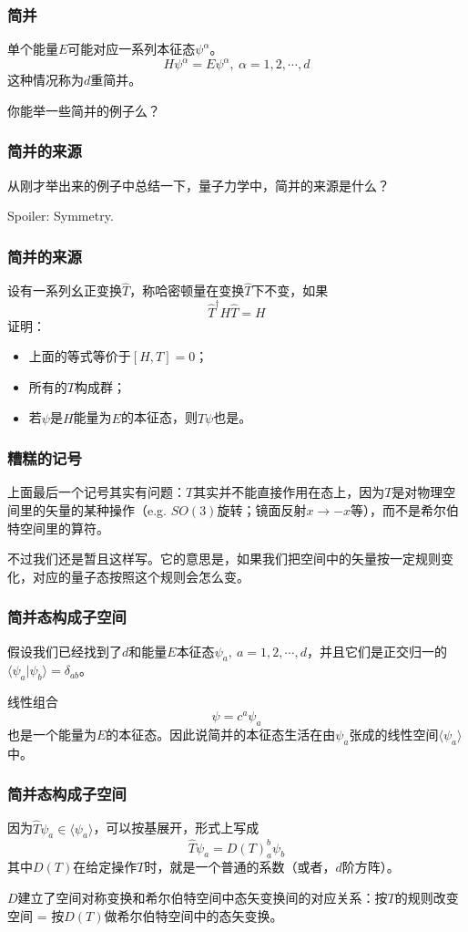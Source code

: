 \documentclass[CJK]{beamer}
\begin{document}
\begin{frame}
\frametitle{\bch 简并 \ech}
\bch
单个能量$E$可能对应一系列本征态$\psi^\alpha$。
$$
H \psi^\alpha = E \psi^\alpha ,\ \alpha = 1,2,\cdots , d
$$
这种情况称为$d$重简并。
\par
你能举一些简并的例子么？
\ech
\end{frame}

\begin{frame}
\frametitle{\bch 简并的来源 \ech}
\bch
从刚才举出来的例子中总结一下，量子力学中，简并的来源是什么？
\par
Spoiler: Symmetry.
\ech
\end{frame}

\begin{frame}
\frametitle{\bch 简并的来源 \ech}
\bch
设有一系列幺正变换$\hat T$，称哈密顿量在变换$\hat T$下不变，如果
$$
\hat{T}^\dagger H \hat T = H
$$
证明：
\begin{itemize}
\item 上面的等式等价于$[H,T] = 0$；
\item 所有的$T$构成群；
\item 若$\psi$是$H$能量为$E$的本征态，则$\hat T \psi$也是。
\end{itemize}

\ech
\end{frame}

\begin{frame}
\frametitle{\bch 糟糕的记号 \ech}
\bch
上面最后一个记号其实有问题：$T$其实并不能直接作用在态上，因为$T$是对物理空间里的矢量的某种操作（e.g. $SO(3)$旋转；镜面反射$x \to -x$等），而不是希尔伯特空间里的算符。
\par
不过我们还是暂且这样写。它的意思是，如果我们把空间中的矢量按一定规则变化，对应的量子态按照这个规则会怎么变。

\ech
\end{frame}

\begin{frame}
\frametitle{\bch 简并态构成子空间 \ech}
\bch
假设我们已经找到了$d$和能量$E$本征态$\psi_a,\ a = 1,2,\cdots,d$，并且它们是正交归一的$\langle \psi_a | \psi_b \rangle = \delta_{ab}$。
\par
线性组合
$$
\psi = c^a \psi_a
$$
也是一个能量为$E$的本征态。因此说简并的本征态生活在由$\psi_a$张成的线性空间$\langle \psi_a \rangle$中。
\ech
\end{frame}


\begin{frame}
\frametitle{\bch 简并态构成子空间 \ech}
\bch
因为$\hat T \psi_a \in \langle \psi_a \rangle$，可以按基展开，形式上写成
$$
\hat T \psi_a = D(T)_a^b \psi_b
$$
其中$D(T)$在给定操作$T$时，就是一个普通的系数（或者，$d$阶方阵）。
\par
$D$建立了空间对称变换和希尔伯特空间中态矢变换间的对应关系：按$T$的规则改变空间 = 按$D(T)$做希尔伯特空间中的态矢变换。
\ech
\end{frame}
\end{document}
